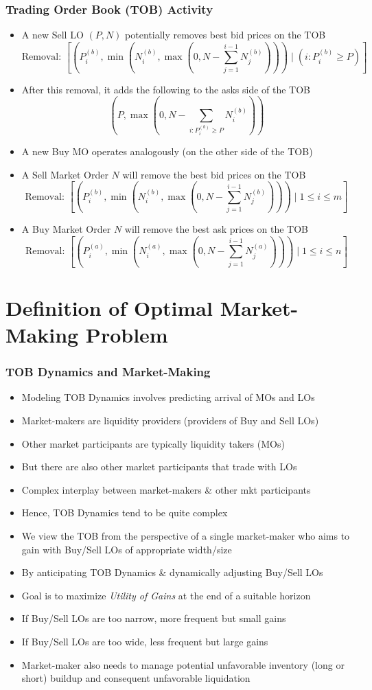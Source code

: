 \documentclass[handout]{beamer}
\begin{document}
\begin{frame}
\frametitle{Trading Order Book (TOB) Activity}
\pause
\begin{itemize}[<+->]
\item A new Sell LO $(P,N)$ potentially removes best bid prices on the TOB
$$\mbox{Removal: } [(P_i^{(b)}, \min(N_i^{(b)}, \max(0, N - \sum_{j=1}^{i-1} N_j^{(b)}))) \mid (i: P_i^{(b)} \geq P)]$$
\item After this removal, it adds the following to the asks side of the TOB 
$$(P, \max(0, N - \sum_{i: P_i^{(b)} \geq P}  N_i^{(b)}))$$
\item A new Buy MO operates analogously (on the other side of the TOB)
\item A Sell Market Order $N$ will remove the best bid prices on the TOB
$$\mbox{Removal: } [(P_i^{(b)}, \min(N_i^{(b)}, \max(0, N - \sum_{j=1}^{i-1} N_j^{(b)}))) \mid 1 \leq i \leq m]$$
\item A Buy Market Order $N$ will remove the best ask prices on the TOB
$$\mbox{Removal: } [(P_i^{(a)}, \min(N_i^{(a)}, \max(0, N - \sum_{j=1}^{i-1} N_j^{(a)}))) \mid 1 \leq i \leq n]$$
\end{itemize}
\end{frame}

\section{Definition of Optimal Market-Making Problem}

\begin{frame}
\frametitle{TOB Dynamics and Market-Making}
\pause
\begin{itemize}[<+->]
\item Modeling TOB Dynamics involves predicting arrival of MOs and LOs
\item Market-makers are liquidity providers (providers of Buy and Sell LOs)
\item Other market participants are typically liquidity takers (MOs)
\item But there are also other market participants that trade with LOs
\item Complex interplay between market-makers \& other mkt participants
\item Hence, TOB Dynamics tend to be quite complex
\item We view the TOB from the perspective of a single market-maker who aims to gain with Buy/Sell LOs of appropriate width/size
\item By anticipating TOB Dynamics \& dynamically adjusting Buy/Sell LOs
\item Goal is to maximize {\em Utility of Gains} at the end of a suitable horizon
\item If Buy/Sell LOs are too narrow, more frequent but small gains
\item If Buy/Sell LOs are too wide, less frequent but large gains
\item Market-maker also needs to manage potential unfavorable inventory (long or short) buildup and consequent unfavorable liquidation
\end{itemize}
\end{frame}
\end{document}
